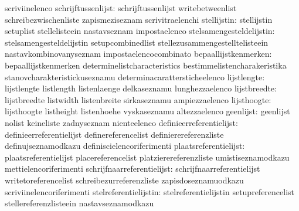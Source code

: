                                  scriviinelenco
             schrijftussenlijst:  schrijftussenlijst               writebetweenlist
                                  schreibezwischenliste            zapismeziseznam
                                  scrivitraelenchi
                    stellijstin:  stellijstin                      setuplist
                                  stellelisteein                   nastavseznam
                                  impostaelenco
       stelsamengesteldelijstin:  stelsamengesteldelijstin         setupcombinedlist
                                  stellezusammengestelltelisteein  nastavkombinovanyseznam
                                  impostaelencocombinato
           bepaallijstkenmerken:  bepaallijstkenmerken             determinelistcharacteristics
                                  bestimmelistencharakeristika     stanovcharakteristickuseznamu
                                  determinacarattersticheelenco
                    lijstlengte:  lijstlengte                      listlength
                                  listenlaenge                     delkaseznamu
                                  lunghezzaelenco
                   lijstbreedte:  lijstbreedte                     listwidth
                                  listenbreite                     sirkaseznamu
                                  ampiezzaelenco
                    lijsthoogte:  lijsthoogte                      listheight
                                  listenhoehe                      vyskaseznamu
                                  altezzaelenco
                      geenlijst:  geenlijst                        nolist
                                  keineliste                       zadnyseznam
                                  nienteelenco
        definieerreferentielijst: definieerreferentielijst         definereferencelist
                                  definierereferenzliste           definujseznamodkazu
                                  definiscielencoriferimenti
           plaatsreferentielijst: plaatsreferentielijst            placereferencelist
                                  platzierereferenzliste           umistiseznamodkazu
                                  mettielencoriferimenti
      schrijfnaarreferentielijst: schrijfnaarreferentielijst       writetoreferencelist
                                  schreibezurreferenzliste         zapisdoseznamuodkazu
                                  scriviinelencoriferimenti
           stelreferentielijstin: stelreferentielijstin            setupreferencelist
                                  stellereferenzlisteein           nastavseznamodkazu
